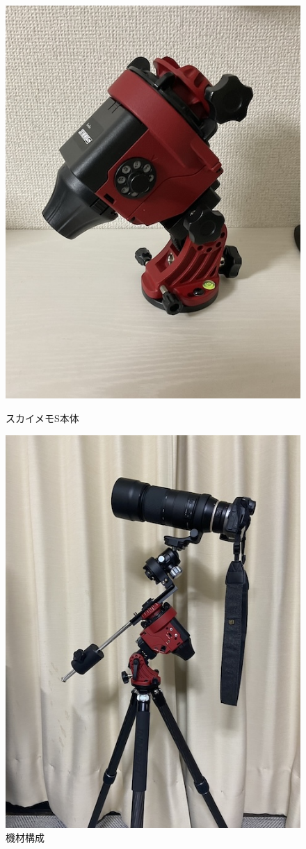 \begin{figure}[H]
  \centering
  \begin{minipage}{0.45\linewidth}
    \centering
    \includegraphics[width=0.8\linewidth]{sections/Kokubun/pictures/main.jpg}
    \caption{スカイメモS本体}
    \label{本体}
  \end{minipage}
  \begin{minipage}{0.45\linewidth}
    \centering
    \includegraphics[width=0.8\linewidth]{sections/Kokubun/pictures/construction.jpg}
    \caption{機材構成}
    \label{構成}
  \end{minipage}
\end{figure}

